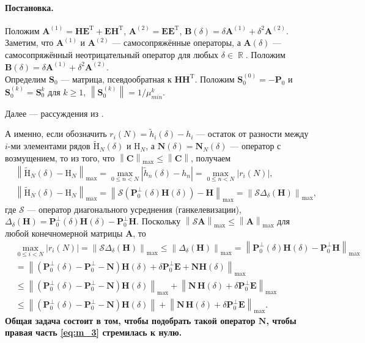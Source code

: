 \documentclass[specialist,
               substylefile = spbu_report.rtx,
               subf,href,colorlinks=true, 12pt]{disser}
\newcommand\norm[1]{\left\|#1\right\|}
\DeclareMathOperator\R{\mathbb{R}}
\newenvironment{statement}{\paragraph{Постановка.}}{\hfill}
\begin{document}
\begin{statement}
Положим $\mathbf{A}^{(1)} = \mathbf{H}\mathbf{E}^\mathrm{T} + \mathbf{E}\mathbf{H}^\mathrm{T}$, $\mathbf{A}^{(2)} = \mathbf{E}\mathbf{E}^\mathrm{T}$, $\mathbf{B}(\delta) = \delta\mathbf{A}^{(1)} + \delta^2\mathbf{A}^{(2)}$. Заметим, что $\mathbf{A}^{(1)}$ и $\mathbf{A}^{(2)}$ --- самосопряжённые операторы, а $\mathbf{A}(\delta)$ --- самосопряжённый неотрицательный оператор для любых $\delta\in\R$. Положим $\mathbf{B}(\delta)=\delta\mathbf{A}^{(1)} + \delta^2\mathbf{A}^{(2)}$.\\
Определим $\mathbf{S}_0$ --- матрица, псевдообратная к $\mathbf{HH}^\mathrm{T}$. Положим $\mathbf{S}_0^{(0)} = -\mathbf{P}_0$ и $\mathbf{S}_0^{(k)}=\mathbf{S}_0^k$ для $k\geqslant1$, $\norm{\mathbf{S}_0^{(k)}}=1/\mu_{min}^k$.

Далее --- рассуждения из \cite[раздел 5.3]{Nekrutkin10}.

А именно, если обозначить $r_i(N)=\widetilde{h}_i(\delta)-h_i$ --- остаток от разности между $i$-ми элементами рядов $\widetilde{\mathrm{H}}_N(\delta)\text{ и }\mathrm{H}_N$, а $\mathbf{N}(\delta) = \mathbf{N}_N(\delta)$ --- оператор с возмущением, то из того, что  $\norm{\mathbf{C}}_{\max}\leqslant \norm{\mathbf{C}}$, получаем
\begin{align*}
	&\norm{\widetilde{\mathrm{H}}_{N}(\delta) - \mathrm{H}_N}_{\max} = \max_{0\leqslant n<N}|\widetilde{h}_n(\delta) - h_n| = \max_{0\leqslant n < N}|r_i(N)|,\\
	&\norm{\widetilde{\mathrm{H}}_{N}(\delta) - \mathrm{H}_N}_{\max} = \norm{\mathcal{S}(\mathbf{P}_0^{\bot}(\delta)\mathbf{H}(\delta)) - \mathbf{H}}_{\max} = \norm{\mathcal{S}\Delta_\delta(\mathbf{H})}_{\max},
\end{align*}
где $\mathcal{S}$ --- оператор диагонального усреднения (ганкелевизации), $\Delta_\delta(\mathbf{H}) = \mathbf{P}_0^\bot(\delta)\mathbf{H}(\delta) - \mathbf{P}_0^\bot\mathbf{H}$. Поскольку $\norm{\mathcal{S}\mathbf{A}}_{\max}\leqslant\norm{\mathbf{A}}_{\max}$ для любой конечномерной матрицы $\mathbf{A}$, то
\begin{align}
	&\max_{0\leqslant i<N} |r_i(N)| = \norm{\mathcal{S}\Delta_\delta(\mathbf{H})}_{\max} \leqslant\norm{\Delta_\delta(\mathbf{H})}_{\max}=\norm{\mathbf{P}_0^\bot(\delta)\mathbf{H}(\delta) - \mathbf{P}_0^\bot\mathbf{H}}_{\max}\nonumber
	\\ 
	&=\norm{(\mathbf{P}_0^\bot(\delta) - \mathbf{P}_0^\bot-\mathbf{N})\mathbf{H}(\delta) + \delta\mathbf{P}_0^\bot\mathbf{E} + \mathbf{N}\mathbf{H}(\delta) }_{\max}\nonumber
	\\
	&\leqslant\norm{(\mathbf{P}_0^\bot(\delta)- \mathbf{P}_0^\bot-\mathbf{N})\mathbf{H}(\delta)}_{\max} + \norm{ \mathbf{N}\, \mathbf{H}(\delta) + \delta \mathbf{P}_0^\perp \mathbf{E}}_{\max}\nonumber
	\\
	&\leqslant\norm{(\mathbf{P}_0^\bot(\delta)- \mathbf{P}_0^\bot-\mathbf{N})\mathbf{H}(\delta)} + \norm{ \mathbf{N}\, \mathbf{H}(\delta) + \delta \mathbf{P}_0^\perp \mathbf{E}}_{\max}.\label{eq:m_3}
\end{align}
{\bf Общая задача состоит в том, чтобы подобрать такой оператор $\mathbf{N}$, чтобы правая часть \eqref{eq:m_3} стремилась к нулю.}
\end{statement}\\
\end{document}

